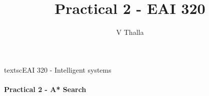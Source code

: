 \documentclass[a4paper,12pt]{report}
\author{V Thalla}
\title{Practical 2 - EAI 320}
\begin{document}
\begin{center}
textsc{\Large EAI 320 - Intelligent systems}\\[0.5cm]
\HRule \\[0.4cm]
{\bfseries Practical 2 - A* Search}
\HRule \\[0.4cm]
\end{center}
\end{document}

